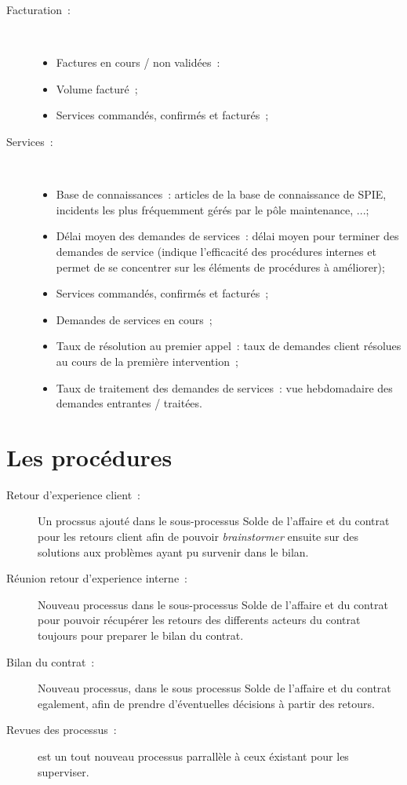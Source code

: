 \begin{description}
        \item[Facturation~:] ~ \\
            \begin{itemize}
                \item Factures en cours / non validées~:
                \item Volume facturé~;
                \item Services commandés, confirmés et facturés~;
            \end{itemize}

        \item[Services~:] ~ \\
            \begin{itemize}
                \item Base de connaissances~: articles de la base de connaissance de SPIE, incidents les plus fréquemment gérés par le pôle maintenance, ...;
                \item Délai moyen des demandes de services~: délai moyen pour terminer des demandes de service (indique l'efficacité des procédures internes et permet de se concentrer sur les éléments de procédures à améliorer);
                \item Services commandés, confirmés et facturés~;
                \item Demandes de services en cours~;
                \item Taux de résolution au premier appel~: taux de demandes client résolues au cours de la première intervention~;
                \item Taux de traitement des demandes de services~: vue hebdomadaire des demandes entrantes / traitées.
            \end{itemize}

    \end{description}

\section{Les procédures}

\begin{description}
    \item[Retour d'experience client~:] Un procssus ajouté dans le sous-processus Solde de l'affaire et du contrat pour les retours client afin de pouvoir \textit{brainstormer} ensuite sur des solutions aux problèmes ayant
    pu survenir dans le bilan.
    \item[R\'eunion retour d'experience interne~:] Nouveau processus dans le sous-processus Solde de l'affaire et du contrat pour pouvoir r\'ecup\'erer les retours des differents acteurs du contrat toujours pour preparer
    le bilan du contrat.
    \item[Bilan du contrat~:] Nouveau processus, dans le sous processus Solde de l'affaire et du contrat egalement, afin de prendre d'éventuelles d\'ecisions \`a partir des retours.
    \item[Revues des processus~:] est un tout nouveau processus parrall\`ele \`a ceux \'existant pour les superviser.
\end{description}



